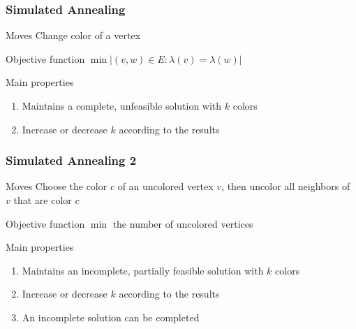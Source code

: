 \begin{frame}[fragile]
\frametitle{Simulated Annealing}
\begin{block}{Moves}
Change color of a vertex
\end{block}

\begin{block}{Objective function}
\(\min |(v,w)\in E: \lambda(v)=\lambda(w)|\)
\end{block}
\begin{block}{Main properties}
\begin{enumerate}
\item
      Maintains a complete, unfeasible solution with \(k\) colors
\item
      Increase or decrease \(k\) according to the results
\end{enumerate}
\end{block}
\end{frame}

\begin{frame}[fragile]
\frametitle{Simulated Annealing 2}
\begin{block}{Moves}
Choose the color \(c\) of an uncolored vertex \(v\), then uncolor all neighbors
of \(v\) that are color \(c\)
\end{block}

\begin{block}{Objective function}
\(\min \) the number of uncolored vertices
\end{block}
\begin{block}{Main properties}
\begin{enumerate}
\item
      Maintains an incomplete, partially feasible solution with \(k\) colors
\item
      Increase or decrease \(k\) according to the results
\item
      An incomplete solution can be completed
\end{enumerate}
\end{block}
\end{frame}

